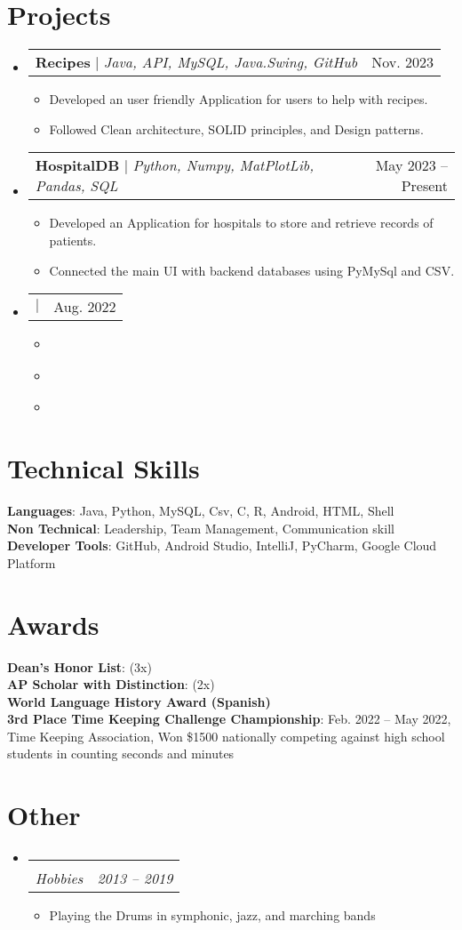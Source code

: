 \documentclass[letterpaper,11pt]{article}
\makeatletter
\newcommand{\resumeItem}[1]{
  \item\small{
    {#1 \vspace{-2pt}}
  }
}
\newcommand{\resumeSubheading}[4]{
  \vspace{-2pt}\item
    \begin{tabular*}{0.97\textwidth}[t]{l@{\extracolsep{\fill}}r}
      \textbf{#1} & #2 \\
      \textit{\small#3} & \textit{\small #4} \\
    \end{tabular*}\vspace{-7pt}
}
\newcommand{\resumeProjectHeading}[2]{
    \item
    \begin{tabular*}{0.97\textwidth}{l@{\extracolsep{\fill}}r}
      \small#1 & #2 \\
    \end{tabular*}\vspace{-7pt}
}
\newcommand{\resumeSubHeadingListStart}{\begin{itemize}[leftmargin=0.15in, label={}]}
\newcommand{\resumeSubHeadingListEnd}{\end{itemize}}
\newcommand{\resumeItemListStart}{\begin{itemize}}
\newcommand{\resumeItemListEnd}{\end{itemize}\vspace{-5pt}}
\makeatother
\begin{document}
\section{Projects}
    \resumeSubHeadingListStart
      \resumeProjectHeading
          {\textbf{Recipes} $|$ \emph{Java, API, MySQL, Java.Swing, GitHub}}{Nov. 2023}
          \resumeItemListStart
            \resumeItem{Developed an user friendly Application for users to help with recipes.}
            \resumeItem{Followed Clean architecture, SOLID principles, and Design patterns.}
          \resumeItemListEnd
      \resumeProjectHeading
          {\textbf{HospitalDB} $|$ \emph{Python, Numpy, MatPlotLib, Pandas, SQL}}{May 2023 -- Present}
          \resumeItemListStart
            \resumeItem{Developed an Application for hospitals to store and retrieve records of patients.}
            \resumeItem{Connected the main UI with backend databases using PyMySql and CSV.}
          \resumeItemListEnd
      \resumeProjectHeading
          {\textbf{} $|$ \emph{}}{Aug. 2022}
          \resumeItemListStart
            \resumeItem{}
            \resumeItem{}
            \resumeItem{}
          \resumeItemListEnd
    \resumeSubHeadingListEnd

\section{Technical Skills}
 \begin{itemize}[leftmargin=0.15in, label={}]
    \small{\item{
     \textbf{Languages}{: Java, Python, MySQL, Csv, C, R, Android, HTML, Shell} \\
     \textbf{Non Technical}{: Leadership, Team Management, Communication skill} \\
     \textbf{Developer Tools}{: GitHub, Android Studio, IntelliJ, PyCharm, Google Cloud Platform} \\
     }}
 \end{itemize}

\section{Awards}
 \begin{itemize}[leftmargin=0.15in, label={}]
    \small{\item{
     \textbf{Dean’s Honor List}{: (3x)} \\
     \textbf{AP Scholar with Distinction}{: (2x)} \\
     \textbf{World Language History Award (Spanish)}{ } \\
     \textbf{3rd Place Time Keeping Challenge Championship}{: Feb. 2022 -- May 2022, Time Keeping Association, Won \$1500 nationally competing against high school students in counting seconds and minutes}
    }}
 \end{itemize}

\section{Other}
\resumeSubHeadingListStart
    \resumeSubheading
      {}{ }
      {Hobbies}{2013 -- 2019}
      \resumeItemListStart
        \resumeItem{Playing the Drums in symphonic, jazz, and marching bands}
      \resumeItemListEnd
\resumeSubHeadingListEnd
\end{document}
